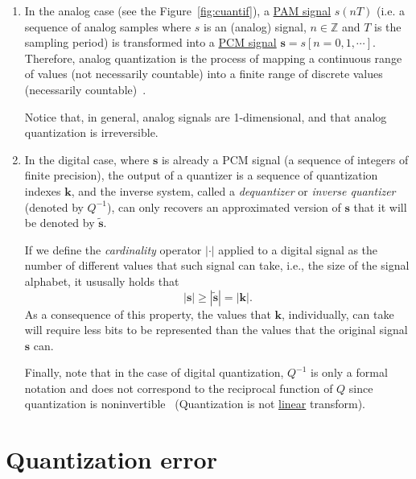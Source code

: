 \begin{enumerate}
\item In the analog case (see the Figure~\ref{fig:cuantif}), a
  \href{https://en.wikipedia.org/wiki/Pulse-amplitude_modulation}{PAM
    signal} $s(nT)$ (i.e. a sequence of analog samples
  where $s$ is an (analog) signal, $n\in{\mathbb{Z}}$ and $T$ is the
  sampling period) is transformed into a
  \href{https://en.wikipedia.org/wiki/Pulse-code_modulation}{PCM
    signal} ${\mathbf s}=s[n=0,1,\cdots]$. Therefore, analog
  quantization is the process of mapping a continuous range of values
  (not necessarily countable) into a finite range of discrete values
  (necessarily countable)~\cite{vetterli1995wavelets}.

  Notice that, in general, analog signals are 1-dimensional, and that
  analog quantization is irreversible.
  
\item In the digital case, where ${\mathbf s}$ is already a PCM signal
  (a sequence of integers of finite precision), the output of a
  quantizer is a sequence of quantization indexes ${\mathbf k}$, and
  the inverse system, called a \emph{dequantizer} or \emph{inverse
  quantizer} (denoted by $Q^{-1}$), can only recovers an approximated
  version of ${\mathbf s}$ that it will be denoted by $\tilde{\mathbf
    s}$.

  If we define the \emph{cardinality} operator $|\cdot|$ applied to a
  digital signal as the number of different values that such signal
  can take, i.e., the size of the signal alphabet, it ususally holds
  that
  \begin{equation}
    |{\mathbf s}|\geq|\tilde{\mathbf s}| = |{\mathbf k}|.
  \end{equation}
  As a consequence of this property, the values that ${\mathbf k}$,
  individually, can take will require less bits to be represented than
  the values that the original signal ${\mathbf s}$ can.

  Finally, note that in the case of digital quantization, $Q^{-1}$ is
  only a formal notation and does not correspond to the reciprocal
  function of $Q$ since quantization is
  noninvertible~\cite{duhamel2009joint} (Quantization is not
  \href{https://en.wikipedia.org/wiki/Linear_map}{linear} transform).
  
\end{enumerate}

\section{Quantization error}

